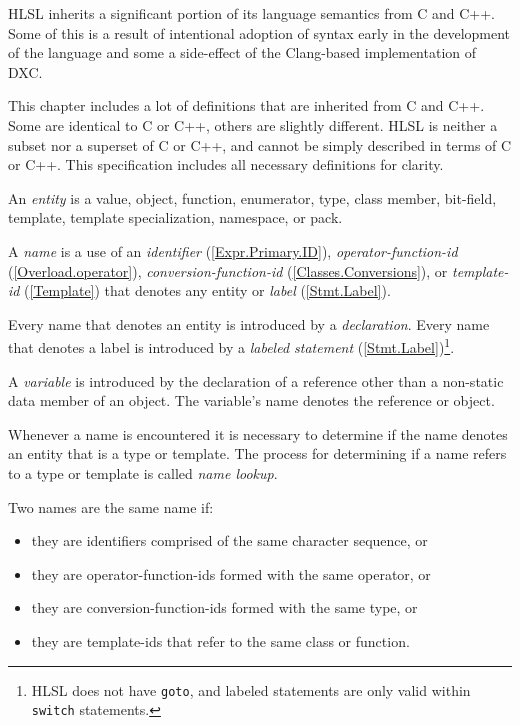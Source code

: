 
\begin{note}
  \p HLSL inherits a significant portion of its language semantics from C and C++.
  Some of this is a result of intentional adoption of syntax early in the development
  of the language and some a side-effect of the Clang-based implementation of DXC.

  \p This chapter includes a lot of definitions that are inherited from C and C++.
  Some are identical to C or C++, others are slightly different. HLSL is neither
  a subset nor a superset of C or C++, and cannot be simply described in terms
  of C or C++. This specification includes all necessary definitions for clarity.
\end{note}


\p An \textit{entity} is a value, object, function, enumerator, type, class
member, bit-field, template, template specialization, namespace, or pack.

\p A \textit{name} is a use of an \textit{identifier} (\ref{Expr.Primary.ID}),
\textit{operator-function-id} (\ref{Overload.operator}),
\textit{conversion-function-id} (\ref{Classes.Conversions}),
or \textit{template-id} (\ref{Template}) that denotes any entity or
\textit{label} (\ref{Stmt.Label}).

\p Every name that denotes an entity is introduced by a \textit{declaration}.
Every name that denotes a label is introduced by a \textit{labeled statement}
(\ref{Stmt.Label})\footnote{HLSL does not have \texttt{goto}, and labeled
statements are only valid within \texttt{switch} statements.}.

\p A \textit{variable} is introduced by the declaration of a reference other
than a non-static data member of an object. The variable's name denotes the
reference or object.

\p Whenever a name is encountered it is necessary to determine if the name
denotes an entity that is a type or template. The process for determining if a
name refers to a type or template is called \textit{name lookup}.

\p Two names are the same name if:
\begin{itemize}
\item they are identifiers comprised of the same character sequence, or
\item they are operator-function-ids formed with the same operator, or
\item they are conversion-function-ids formed with the same type, or
\item they are template-ids that refer to the same class or function.
\end{itemize}

